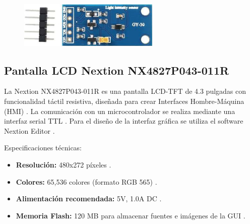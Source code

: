 \begin{figure}[H]
    \centering
    \includegraphics[width=0.6\textwidth]{Diagramas/lum.png}
\end{figure}
\subsection{Pantalla LCD Nextion NX4827P043-011R}

La Nextion NX4827P043-011R es una pantalla LCD-TFT de 4.3 pulgadas con funcionalidad táctil resistiva, diseñada para crear Interfaces Hombre-Máquina (HMI) \cite{nextion}. La comunicación con un microcontrolador se realiza mediante una interfaz serial TTL \cite{nextion}. Para el diseño de la interfaz gráfica se utiliza el software Nextion Editor \cite{nextion}.

Especificaciones técnicas:

\begin{itemize}
    \item \textbf{Resolución:} 480x272 píxeles \cite{nextion}.
    \item \textbf{Colores:} 65,536 colores (formato RGB 565) \cite{nextion}.
    \item \textbf{Alimentación recomendada:} 5V, 1.0A DC \cite{nextion}.
    \item \textbf{Memoria Flash:} 120 MB para almacenar fuentes e imágenes de la GUI \cite{nextion}.
\end{itemize}
